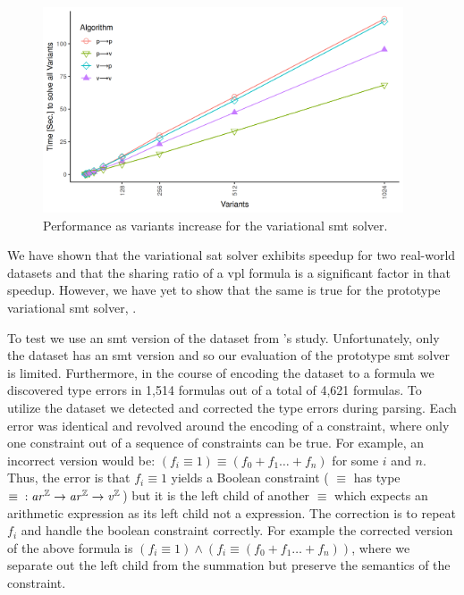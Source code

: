 \label{section:case-studies:vsmt}
%
\begin{figure}[h]
  \includegraphics[width=0.95\textwidth]{Plots/RQ1_Fin_Smt}
  \caption{Performance as variants increase for the variational
    \ac{smt} solver.}%
  \label{res:rq1:vsmt}
\end{figure}
%
We have shown that the variational \ac{sat} solver exhibits speedup for two
real-world datasets and that the sharing ratio of a \ac{vpl} formula is a
significant factor in that speedup. However, we have yet to show that the same
is true for the prototype variational \ac{smt} solver, \vsmt{}.

To test \vsmt{} we use an \ac{smt} version of the \fin{} dataset from \nieke{}'s
study. Unfortunately, only the \fin{} dataset has an \ac{smt} version and so our
evaluation of the prototype \ac{smt} solver is limited. Furthermore, in the
course of encoding the dataset to a \evpl{} formula we discovered type errors in
1,514 formulas out of a total of 4,621 formulas. To utilize the dataset we
detected and corrected the type errors during parsing. Each error was identical
and revolved around the encoding of a  constraint, where only one
constraint out of a sequence of constraints can be true. For example, an
incorrect version would be: $(f_{i} \equiv{} 1) \equiv{} (f_{0} + f_{1} \ldots{}
+ f_{n})$ for some $i$ and $n$. Thus, the error is that $f_{i} \equiv 1$ yields
a Boolean constraint (\ie{} $\equiv$ has type $\equiv{} : \mathit{ar^{\mathbb{Z}}}{} \rightarrow
\mathit{ar^{\mathbb{Z}}}{} \rightarrow{} \mathit{v^{\mathbb{Z}}}{}$) but it is the left child of another $\equiv$ which
expects an arithmetic expression as its left child not a \eIL{} expression. The
correction is to repeat $f_{i}$ and handle the boolean constraint correctly. For
example the corrected version of the above formula is $(f_{i} \equiv{} 1)
\wedge{} (f_{i} \equiv{} (f_{0} + f_{1} \ldots{} + f_{n}))$, where we separate
out the left child from the summation but preserve the semantics of the
 constraint.

